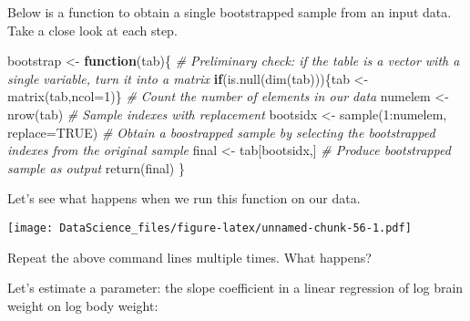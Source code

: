 \documentclass[
]{book}
\newenvironment{Shaded}{\begin{snugshade}}{\end{snugshade}}
\newcommand{\AttributeTok}[1]{\textcolor[rgb]{0.77,0.63,0.00}{#1}}
\newcommand{\CommentTok}[1]{\textcolor[rgb]{0.56,0.35,0.01}{\textit{#1}}}
\newcommand{\ConstantTok}[1]{\textcolor[rgb]{0.00,0.00,0.00}{#1}}
\newcommand{\ControlFlowTok}[1]{\textcolor[rgb]{0.13,0.29,0.53}{\textbf{#1}}}
\newcommand{\DecValTok}[1]{\textcolor[rgb]{0.00,0.00,0.81}{#1}}
\newcommand{\FunctionTok}[1]{\textcolor[rgb]{0.00,0.00,0.00}{#1}}
\newcommand{\NormalTok}[1]{#1}
\newcommand{\OtherTok}[1]{\textcolor[rgb]{0.56,0.35,0.01}{#1}}
\newcommand{\SpecialCharTok}[1]{\textcolor[rgb]{0.00,0.00,0.00}{#1}}
\begin{document}
Below is a function to obtain a single bootstrapped sample from an input data. Take a close look at each step.

\begin{Shaded}
\begin{Highlighting}[]
\NormalTok{bootstrap }\OtherTok{\textless{}{-}} \ControlFlowTok{function}\NormalTok{(tab)\{}
  \CommentTok{\# Preliminary check: if the table is a vector with a single variable, turn it into a matrix}
  \ControlFlowTok{if}\NormalTok{(}\FunctionTok{is.null}\NormalTok{(}\FunctionTok{dim}\NormalTok{(tab)))\{tab }\OtherTok{\textless{}{-}} \FunctionTok{matrix}\NormalTok{(tab,}\AttributeTok{ncol=}\DecValTok{1}\NormalTok{)\}}
  \CommentTok{\# Count the number of elements in our data}
\NormalTok{  numelem }\OtherTok{\textless{}{-}} \FunctionTok{nrow}\NormalTok{(tab)}
  \CommentTok{\# Sample indexes with replacement}
\NormalTok{  bootsidx }\OtherTok{\textless{}{-}} \FunctionTok{sample}\NormalTok{(}\DecValTok{1}\SpecialCharTok{:}\NormalTok{numelem, }\AttributeTok{replace=}\ConstantTok{TRUE}\NormalTok{)}
  \CommentTok{\# Obtain a boostrapped sample by selecting the bootstrapped indexes from the original sample}
\NormalTok{  final }\OtherTok{\textless{}{-}}\NormalTok{ tab[bootsidx,]}
  \CommentTok{\# Produce bootstrapped sample as output}
  \FunctionTok{return}\NormalTok{(final)}
\NormalTok{\}}
\end{Highlighting}
\end{Shaded}

Let's see what happens when we run this function on our data.

\begin{Shaded}
\end{Shaded}

\texttt{[image: DataScience\_files/figure-latex/unnamed-chunk-56-1.pdf]}

Repeat the above command lines multiple times. What happens?

Let's estimate a parameter: the slope coefficient in a linear regression of log brain weight on log body weight:

\begin{Shaded}
\end{Shaded}
\end{document}
